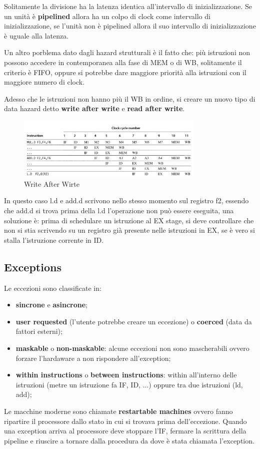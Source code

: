 \documentclass[12pt]{article}
\begin{document}
Solitamente la divisione ha la latenza identica all'intervallo di inizializzazione. Se un unit\`a \`e \textbf{pipelined} allora ha un colpo di clock come intervallo di inizializzazione, se l'unit\`a non \`e pipelined allora il suo intervallo di inizializzazione \`e uguale alla latenza.


Un altro porblema dato dagli hazard strutturali \`e il fatto che: pi\`u istruzioni non possono accedere in contemporanea alla fase di MEM o di WB, solitamente il criterio \`e FIFO, oppure si potrebbe dare maggiore priorit\`a alla istruzioni con il maggiore numero di clock.

Adesso che le istruzioni non hanno pi\`u il WB in ordine, si creare un nuovo tipo di data hazard detto \textbf{write after write} e \textbf{read after write}.
\begin{figure}[H]
    \centering
    \includegraphics[width=0.8\textwidth]{write-after-wirte.png}
    \caption{Write After Wirte}
    \label{fig:write-after-wirte}
\end{figure}
In questo caso l.d e add.d scrivono nello stesso momento sul registro f2, essendo che add.d si trova prima della l.d l'operazione non pu\`o essere eseguita, una soluzione \`e: prima di schedulare un istruzione al EX stage, si deve controllare che non si stia scrivendo su un registro gi\`a presente nelle istruzioni in EX, se \`e vero si stalla l'istruzione corrente in ID.



\subsection{Exceptions}
Le eccezioni sono classificate in:
\begin{itemize}
    \item \textbf{sincrone} e \textbf{asincrone};
    \item \textbf{user requested} (l'utente potrebbe creare un eccezione) o \textbf{coerced} (data da fattori esterni);
    \item \textbf{maskable} o \textbf{non-maskable}: alcune eccezioni non sono mascherabili ovvero forzare l'hardaware a non rispondere all'exception;
    \item \textbf{within instructions} o \textbf{between instructions}: within all'interno delle istruzioni (metre un istruzione fa IF, ID, ...) oppure tra due istruzioni (ld, add);
\end{itemize}
Le macchine moderne sono chiamate \textbf{restartable machines} ovvero fanno ripartire il processore dallo stato in cui si trovava prima dell'eccezione. Quando una exception arriva al processore deve stoppare l'IF, fermare la scrittura della pipeline e riuscire a tornare dalla procedura da dove \`e stata chiamata l'exception.
\end{document}
